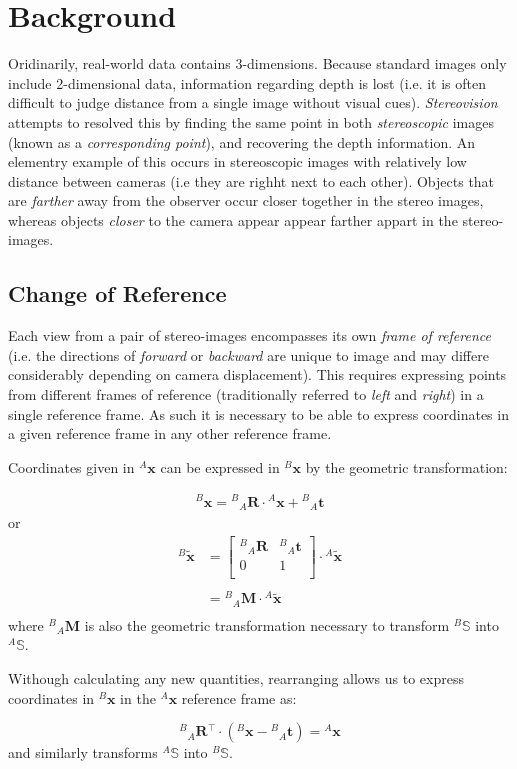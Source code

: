 \documentclass{report}
\newcommand{\tR}[0]{\ensuremath{^{A}}}
\newcommand{\bR}[0]{\ensuremath{_{A}}}
\newcommand{\tL}[0]{\ensuremath{^{B}}}
\newcommand{\tT}[0]{\ensuremath{^{\intercal}}}
\newcommand{\rL}[0]{\ensuremath{{\tL\bR}}}
\newcommand{\xL}[0]{\ensuremath{{\tL\mathbf{x}}}}
\newcommand{\xR}[0]{\ensuremath{{\tR\mathbf{x}}}}
\newcommand{\hxL}[0]{\ensuremath{{\tL\tilde{\mathbf{x}}}}}
\newcommand{\hxR}[0]{\ensuremath{{\tR\tilde{\mathbf{x}}}}}
\newcommand{\rLM}[0]{\ensuremath{{\tL\bR}\mathbf{M}}}
\newcommand{\rLR}[0]{\ensuremath{{\tL\bR}\mathbf{R}}}
\newcommand{\rLt}[0]{\ensuremath{{\tL\bR}\mathbf{t}}}
\newcommand{\sR}[0]{\ensuremath{^{A}\mathbb{S}}}
\newcommand{\sL}[0]{\ensuremath{^{B}\mathbb{S}}}
\begin{document}
\chapter{Background}
\par 
Oridinarily, real-world data contains 3-dimensions. 
Because standard images only include 2-dimensional data, information regarding depth is lost (i.e. it is often difficult to judge distance from a single image without visual cues). 
\textit{Stereovision} attempts to resolved this by finding the same point in both \textit{stereoscopic} images (known as a \textit{corresponding point}), and recovering the depth information.
An elementry example of this occurs in stereoscopic images with relatively low distance between cameras (i.e they are righht next to each other). 
Objects that are \textit{farther} away from the observer occur closer together in the stereo images, whereas objects \textit{closer} to the camera appear appear farther appart in the stereo-images.

\section{Change of Reference}
\par
Each view from a pair of stereo-images encompasses its own \textit{frame of reference} (i.e. the directions of \textit{forward} or \textit{backward} are unique to image and may differe considerably depending on camera displacement).
This requires expressing points from different frames of reference (traditionally referred to \textit{left} and \textit{right}) in a single reference frame. 
As such it is necessary to be able to express coordinates in a given reference frame in any other reference frame.
\par
Coordinates given in $\xR$ can be expressed in $\xL$ by the geometric transformation:
\renewcommand{\arraystretch}{1.5}
\par
\begin{align*}
	\xL = \rLR \cdot \xR + \rLt
\end{align*}
or
\begin{align*}
	\hxL &=
	\left[\begin{array}{c|c}
		\rL\textbf{R} & \rL\textbf{t} \\\hline
		0 & 1 \\
	\end{array}\right]
	\cdot\hxR \\
	&\\
	&= \rLM\cdot\hxR\\
\end{align*}
where $\rLM$ is also the geometric transformation necessary to transform $\sL$ into $\sR$. 
\par
Withough calculating any new quantities, rearranging allows us to express coordinates in $\xL$ in the $\xR$ reference frame as:
\par
\begin{equation*}
	{\rLR\tT}\cdot (\xL - \rLt ) = \xR
\end{equation*}
and similarly transforms $\sR$ into $\sL$.
\end{document}
